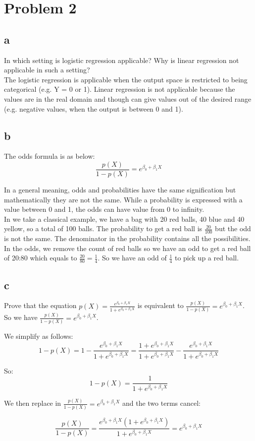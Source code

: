 \section*{Problem 2}

\subsection*{a}
In which setting is logistic regression applicable? Why is linear regression not applicable in such a setting?\\

The logistic regression is applicable when the output space is restricted to being categorical (e.g. Y = 0 or 1). Linear regression is not applicable because the values are in the real domain and though can give values out of the desired range (e.g. negative values, when the output is between 0 and 1). 

\subsection*{b}
The odds formula is as below: 
\[ \frac{p(X)}{1 - p(X)} = e^{\beta_0 + \beta_1 X} \]

In a general meaning, odds and probabilities have the same signification but mathematically they are not the same. While a probability is expressed with a value between 0 and 1, the odds can have value from 0 to infinity. \\

In we take a classical example, we have a bag with 20 red balls, 40 blue and 40 yellow, so a total of 100 balls. The probability to get a red ball is $\frac{20}{100}$ but the odd is not the same. The denominator in the probability contains all the possibilities. In the odds, we remove the count of red balls so we have an odd to get a red ball of 20:80 which equals to $\frac{20}{80} = \frac{1}{4}$. So we have an odd of $\frac{1}{4}$ to pick up a red ball.  

\subsection*{c}

Prove that the equation $ p(X) = \frac{e^{\beta_0 + \beta_1 X}}{1 + e^{\beta_0 + \beta_1 X}} $ is equivalent to $\frac{p(X)}{1 - p(X)} = e^{\beta_0 + \beta_1 X}  $.\\

So we have $\frac{p(X)}{1 - p(X)} = e^{\beta_0 + \beta_1 X} $.

We simplify as follows:
\[ 1 - p(X) = 1 - \frac{e^{\beta_0 + \beta_1 X}}{1 + e^{\beta_0 + \beta_1 X}} = \frac{1 + e^{\beta_0 + \beta_1 X}}{1 + e^{\beta_0 + \beta_1 X}} - \frac{e^{\beta_0 + \beta_1 X}}{1 + e^{\beta_0 + \beta_1 X}}\]

So: 
\[ 1 - p(X) = \frac{1}{1 + e^{\beta_0 + \beta_1 X}} \]

We then replace in $\frac{p(X)}{1 - p(X)} = e^{\beta_0 + \beta_1 X}  $ and the two terms cancel:

\[ \frac{p(X)}{1 - p(X)} = \frac{e^{\beta_0 + \beta_1 X} (1 + e^{\beta_0 + \beta_1 X} )}{1 + e^{\beta_0 + \beta_1 X}} = e^{\beta_0 + \beta_1 X}  \]


